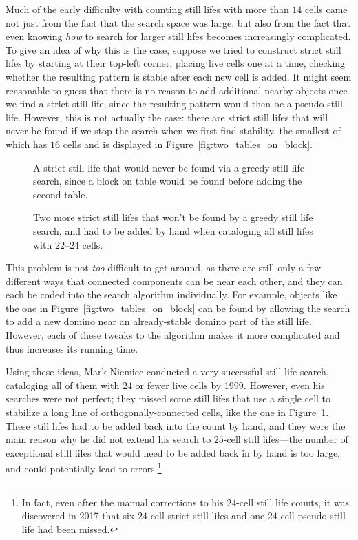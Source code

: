 Much of the early difficulty with counting still lifes with more than $14$ cells came not just from the fact that the search space was large, but also from the fact that even knowing \emph{how} to search for larger still lifes becomes increasingly complicated. To give an idea of why this is the case, suppose we tried to construct strict still lifes by starting at their top-left corner, placing live cells one at a time, checking whether the resulting pattern is stable after each new cell is added. It might seem reasonable to guess that there is no reason to add additional nearby objects once we find a strict still life, since the resulting pattern would then be a pseudo still life. However, this is not actually the case: there are strict still lifes that will never be found if we stop the search when we first find stability, the smallest of which has $16$ cells and is displayed in Figure~\ref{fig:two_tables_on_block}.

\begin{figure}[!htb]
	\centering
	\begin{minipage}{.42\textwidth}
		\centering
		\caption{A strict still life that would never be found via a greedy still life search, since a block on table would be found before adding the second table.}\label{fig:two_tables_on_block}
	\end{minipage} \hfill %
	\begin{minipage}{.54\textwidth}
		\centering
		\caption{Two more strict still lifes that won't be found by a greedy still life search, and had to be added by hand when cataloging all still lifes with $22$--$24$ cells.}\label{fig:sl_hard_to_find}
	\end{minipage}
\end{figure}

This problem is not \emph{too} difficult to get around, as there are still only a few different ways that connected components can be near each other, and they can each be coded into the search algorithm individually. For example, objects like the one in Figure~\ref{fig:two_tables_on_block} can be found by allowing the search to add a new domino near an already-stable domino part of the still life. However, each of these tweaks to the algorithm makes it more complicated and thus increases its running time.

Using these ideas, Mark Niemiec conducted a very successful still life search, cataloging all of them with $24$ or fewer live cells by 1999. However, even his searches were not perfect; they missed some still lifes that use a single cell to stabilize a long line of orthogonally-connected cells, like the one in Figure~\ref{fig:sl_hard_to_find}. These still lifes had to be added back into the count by hand, and they were the main reason why he did not extend his search to $25$-cell still lifes---the number of exceptional still lifes that would need to be added back in by hand is too large, and could potentially lead to errors.\footnote{In fact, even after the manual corrections to his $24$-cell still life counts, it was discovered in 2017 that six $24$-cell strict still lifes and one $24$-cell pseudo still life had been missed.}

